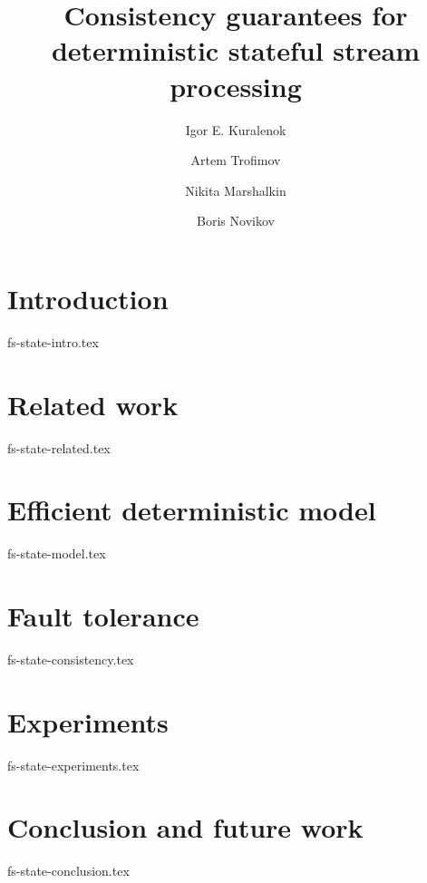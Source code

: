 \documentclass{llncs}
\begin{document}
\title {Consistency guarantees for deterministic stateful stream processing}

\author{Igor E. Kuralenok \and Artem Trofimov \and Nikita Marshalkin \and Boris Novikov}

\maketitle


\begin{abstract}
\end{abstract}

\section {Introduction}
 {fs-state-intro.tex}

\section {Related work}
 {fs-state-related.tex}

\section {Efficient deterministic model}
 {fs-state-model.tex}

\section{Fault tolerance}
 {fs-state-consistency.tex}

\section {Experiments}
 {fs-state-experiments.tex}

\section {Conclusion and future work}
 {fs-state-conclusion.tex}



\end{document}
